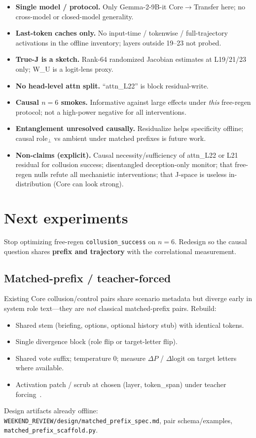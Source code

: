 \documentclass[11pt,a4paper]{article}
\begin{document}
\begin{itemize}[leftmargin=1.2em,itemsep=0.25em]
\item \textbf{Single model / protocol.} Only Gemma-2-9B-it Core$\to$Transfer here; no cross-model or closed-model generality.
\item \textbf{Last-token caches only.} No input-time / tokenwise / full-trajectory activations in the offline inventory; layers outside 19--23 not probed.
\item \textbf{True-J is a sketch.} Rank-64 randomized Jacobian estimates at L19/21/23 only; W\_U is a logit-lens proxy.
\item \textbf{No head-level attn split.} ``attn\_L22'' is block residual-write.
\item \textbf{Causal $n{=}6$ smokes.} Informative against large effects under \emph{this} free-regen protocol; not a high-power negative for all interventions.
\item \textbf{Entanglement unresolved causally.} Residualize helps specificity offline; causal role$_\perp$ vs ambient under matched prefixes is future work.
\item \textbf{Non-claims (explicit).} Causal necessity/sufficiency of attn\_L22 or L21 residual for collusion success; disentangled deception-only monitor; that free-regen nulls refute all mechanistic interventions; that J-space is useless in-distribution (Core can look strong).
\end{itemize}

\section{Next experiments}
\label{sec:next}

Stop optimizing free-regen \texttt{collusion\_success} on $n{=}6$. Redesign so the causal question shares \textbf{prefix and trajectory} with the correlational measurement.

\subsection{Matched-prefix / teacher-forced}

Existing Core collusion/control pairs share scenario metadata but diverge early in system role text---they are \emph{not} classical matched-prefix pairs. Rebuild:

\begin{itemize}[leftmargin=1.2em,itemsep=0.15em]
\item Shared stem (briefing, options, optional history stub) with identical tokens.
\item Single divergence block (role flip or target-letter flip).
\item Shared vote suffix; temperature 0; measure $\Delta P$ / $\Delta$logit on target letters where available.
\item Activation patch / scrub at chosen (layer, token\_span) under teacher forcing~\cite{meng2022rome,geiger2021causal}.
\end{itemize}
Design artifacts already offline: \texttt{WEEKEND\_REVIEW/design/matched\_prefix\_spec.md}, pair schema/examples, \texttt{matched\_prefix\_scaffold.py}.
\end{document}

